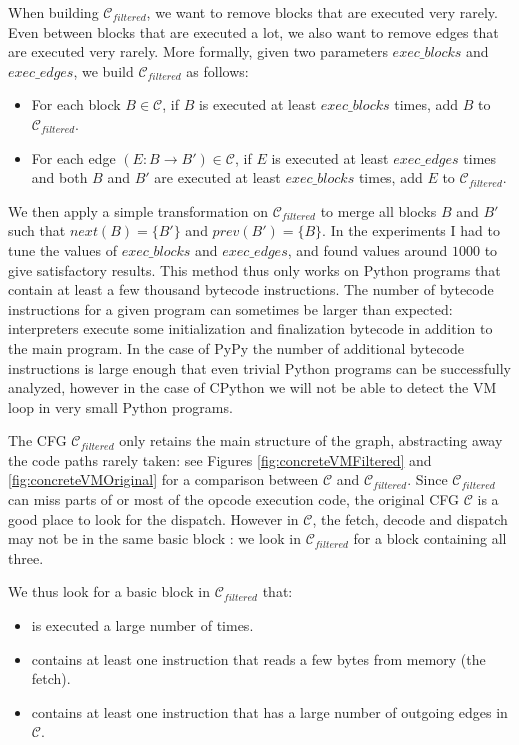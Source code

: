 \documentclass[english]{article}
\begin{document}
When building $\mathcal{C}_{filtered}$, we want to remove blocks that are executed very rarely. Even between blocks that are executed a lot, we also want to remove edges that are executed very rarely. More formally, given two parameters $exec\_blocks$ and $exec\_edges$, we build $\mathcal{C}_{filtered}$ as follows: 
\begin{itemize}
	\item For each block $B \in \mathcal{C}$, if $B$ is executed at least $exec\_blocks$ times, add $B$ to $\mathcal{C}_{filtered}$.
	\item For each edge $(E: B \rightarrow B') \in \mathcal{C}$, if $E$ is executed at least $exec\_edges$ times and both $B$ and $B'$ are executed at least $exec\_blocks$ times, add $E$ to $\mathcal{C}_{filtered}$.
\end{itemize}
We then apply a simple transformation on $\mathcal{C}_{filtered}$ to merge all blocks $B$ and $B'$ such that $next(B) = \{B'\}$ and $prev(B') = \{B\}$. In the experiments I had to tune the values of $exec\_blocks$ and $exec\_edges$, and found values around $1000$ to give satisfactory results. This method thus only works on Python programs that contain at least a few thousand bytecode instructions. The number of bytecode instructions for a given program can sometimes be larger than expected: interpreters execute some initialization and finalization bytecode in addition to the main program. In the case of PyPy the number of additional bytecode instructions is large enough that even trivial Python programs can be successfully analyzed, however in the case of CPython we will not be able to detect the VM loop in very small Python programs.

The CFG $\mathcal{C}_{filtered}$ only retains the main structure of the graph, abstracting away the code paths rarely taken: see Figures \ref{fig:concreteVMFiltered} and \ref{fig:concreteVMOriginal} for a comparison between $\mathcal{C}$ and $\mathcal{C}_{filtered}$. Since $\mathcal{C}_{filtered}$ can miss parts of or most of the opcode execution code, the original CFG $\mathcal{C}$ is a good place to look for the dispatch. However in $\mathcal{C}$, the fetch, decode and dispatch may not be in the same basic block : we look in $\mathcal{C}_{filtered}$ for a block containing all three.

We thus look for a basic block in $\mathcal{C}_{filtered}$ that:
\begin{itemize}
	\item is executed a large number of times.
	\item contains at least one instruction that reads a few bytes from memory (the fetch).
	\item contains at least one instruction that has a large number of outgoing edges in $\mathcal{C}$.
\end{itemize}
\end{document}
